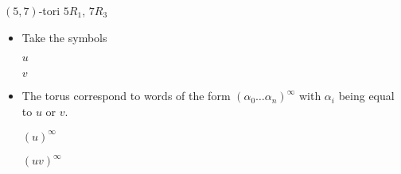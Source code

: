 \documentclass[%
pdf,
colorBG,
slideColor,
]{prosper}
\begin{document}
\begin{slide}{$(5,7)$-tori $5R_1$, $7R_3$}
\begin{itemize}
\item Take the symbols
\begin{center}
\begin{minipage}{5.3cm}
\centering
{}\par
$u$
\end{minipage}
\begin{minipage}{5.3cm}
\centering
{}\par
$v$
\end{minipage}
\end{center}
\item The torus correspond to words of the form $(\alpha_0\dots\alpha_n)^{\infty}$ with $\alpha_i$ being equal to $u$ or $v$.
\begin{center}
\begin{minipage}{5.2cm}
\centering
{}\par
$(u)^{\infty}$
\end{minipage}
\begin{minipage}{5.2cm}
\centering
{}\par
$(uv)^{\infty}$
\end{minipage}
\end{center}

\end{itemize}
\end{slide}
\end{document}
